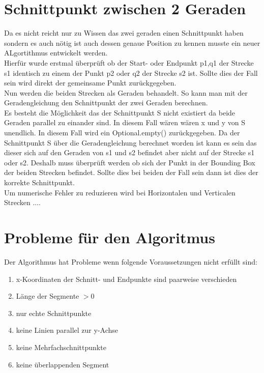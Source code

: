 \documentclass[conference]{IEEEtran}
\begin{document}
	\section{Schnittpunkt zwischen 2 Geraden }
	Da es nicht reicht nur zu Wissen das zwei geraden einen Schnittpunkt haben sondern es auch nötig ist auch dessen genaue Position zu kennen musste ein neuer ALgortithmus entwickelt werden.\\
	Hierfür wurde erstmal überprüft ob der Start- oder Endpunkt p1,q1 der Strecke s1 identisch zu einem der Punkt p2 oder q2 der Strecke s2 ist. Sollte dies der Fall sein wird direkt der gemeinsame Punkt zurückgegeben.\\
	Nun werden die beiden Strecken als Geraden behandelt. So kann man mit der Geradengleichung den Schnittpunkt der zwei Geraden berechnen.\\
	Es besteht die Möglichkeit das der Schnittpunkt S nicht existiert da beide Geraden parallel zu einander sind. In diesem Fall wären wären x und y von S unendlich. In diesem Fall wird ein Optional.empty() zurückgegeben.
	Da der Schnittpunkt S über die Geradengleichung berechnet worden ist kann es sein das dieser sich auf den Geraden von s1 und s2 befindet aber nicht auf der Strecke s1 oder s2. Deshalb muss überprüft werden ob sich der Punkt in der Bounding Box der beiden Strecken befindet. Sollte dies bei beiden der Fall sein dann ist dies der korrekte Schnittpunkt.\\
	Um numerische Fehler zu reduzieren wird bei Horizontalen und Verticalen Strecken ....
	
	\section{Probleme für den Algoritmus}
	Der Algorithmus hat Probleme wenn folgende Voraussetzungen nicht erfüllt sind:
	\begin{enumerate}
		\item x-Koordinaten der Schnitt- und Endpunkte sind paarweise verschieden
		
		\item Länge der Segmente $> 0$
		
		\item nur echte Schnittpunkte
		
		\item keine Linien parallel zur y-Achse
		
		\item keine Mehrfachschnittpunkte
		
		\item keine überlappenden Segment
	\end{enumerate}
	
\end{document}
